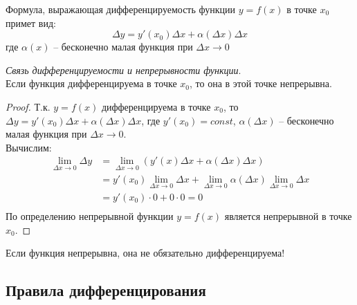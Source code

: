 \begin{corollary}
  Формула, выражающая дифференцируемость функции $y = f(x)$ в точке $x_0$ примет вид: \[
  \Delta y = y'(x_0) \Delta x + \alpha(\Delta x) \Delta x
  \] 
  где $\alpha(x)$ -- бесконечно малая функция при $\Delta x \to 0$
\end{corollary}

\begin{theorem}
  \textit{Связь дифференцируемости и непрерывности функции}. \\
  Если функция дифференцируема в точке $x_0$, то она в этой точке непрерывна. 
\end{theorem}
\begin{proof}
  Т.к. $y = f(x)$ дифференцируема в точке $x_0$, то $\Delta y = y'(x_0) \Delta x + \alpha(\Delta x) \Delta x$, где $y'(x_0) = const$, $\alpha(\Delta x)$ -- бесконечно малая функция при  $\Delta x \to 0$. \\
  Вычислим:
  \begin{align*}
    \lim_{\Delta x \to 0} \Delta y &= \lim_{\Delta x \to 0} (y'(x) \Delta x + \alpha(\Delta x) \Delta x) \\
    &= y'(x_0) \lim_{\Delta x \to 0} \Delta x + \lim_{\Delta x \to 0} \alpha(\Delta x) \lim_{\Delta x \to 0} \Delta x \\
    &= y'(x_0) \cdot 0 + 0 \cdot 0 = 0 \\
  \end{align*}
  По определению непрерывной функции $y = f(x)$ является непрерывной в точке $x_0$.
\end{proof}

\begin{note}
  Если функция непрерывна, она не обязательно дифференцируема!
\end{note}

\subsection{Правила дифференцирования}


